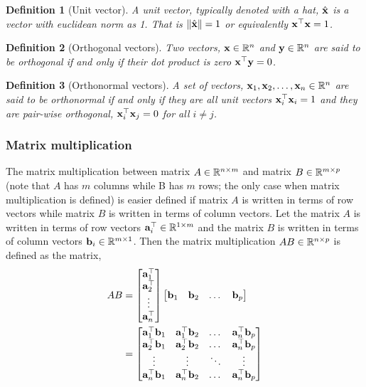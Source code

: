 \documentclass[twocolumn]{article}
\newtheorem{defn}{Definition}
\begin{document}
\begin{defn}[Unit  vector]
  A unit vector, typically denoted  with a hat, $\hat{\mathbf{x}}$ is a vector with
  euclidean norm as 1. That is  $\|\hat{\mathbf{x}}\| = 1$ or equivalently
  $\mathbf{x}^\top\mathbf{x} =  1$.
\end{defn}

\begin{defn}[Orthogonal vectors]
  Two vectors, $\mathbf{x} \in  \mathbb{R}^n$  and $\mathbf{y} \in \mathbb{R}^n$ are said to be
  orthogonal if and only if their dot product is zero $\mathbf{x}^\top \mathbf{y} =  0$.
\end{defn}

\begin{defn}[Orthonormal vectors]
  A set of vectors, $\mathbf{x}_1, \mathbf{x}_2, \dots, \mathbf{x}_n \in  \mathbb{R}^n$  are said to be
  orthonormal if and only if they are all  unit vectors $\mathbf{x}_i^\top\mathbf{x}_i  = 1$
  and they are  pair-wise orthogonal, $\mathbf{x}_i^\top  \mathbf{x}_j =  0$ for all $i \ne j$. 
\end{defn}

\subsubsection{Matrix multiplication}
The matrix multiplication between  matrix  $A \in \mathbb{R}^{n  \times m}$   and
matrix $B  \in \mathbb{R}^{m \times p}$ (note that $A$ has $m$ columns while B has $m$
rows;  the only case when matrix multiplication  is defined) is easier 
defined if matrix $A$  is written in terms  of row vectors while  matrix  $B$ is
written  in  terms  of column vectors. Let  the  matrix $A$  is written in terms
of row   vectors $\mathbf{a}_i^\top   \in \mathbb{R}^{1 \times m}$ and the matrix $B$ is written in terms of column
vectors $\mathbf{b}_i \in \mathbb{R}^{m \times  1}$. Then the matrix multiplication $AB \in
\mathbb{R}^{n \times  p}$ is defined as the matrix,
%
\begin{align}
  AB &= \begin{bmatrix}
    \mathbf{a}_1^\top
    \\
    \mathbf{a}_2^\top
    \\
    \vdots
    \\
    \mathbf{a}_n^\top
    \end{bmatrix}
  \begin{bmatrix}
    \mathbf{b}_1
    &
    \mathbf{b}_2
    &
    \dots
    &
    \mathbf{b}_p
  \end{bmatrix}
      \\
  &= \begin{bmatrix}
    \mathbf{a}_1^\top\mathbf{b}_1 & \mathbf{a}_1^\top\mathbf{b}_2 &  \dots & \mathbf{a}_n^\top \mathbf{b}_p
    \\
    \mathbf{a}_2^\top\mathbf{b}_1 & \mathbf{a}_2^\top\mathbf{b}_2 &  \dots & \mathbf{a}_n^\top \mathbf{b}_p
    \\
    \vdots &  \vdots  &  \ddots  &   \vdots
    \\
    \mathbf{a}_n^\top\mathbf{b}_1 & \mathbf{a}_n^\top\mathbf{b}_2 &  \dots & \mathbf{a}_n^\top \mathbf{b}_p
    \end{bmatrix}
\end{align}
\end{document}
